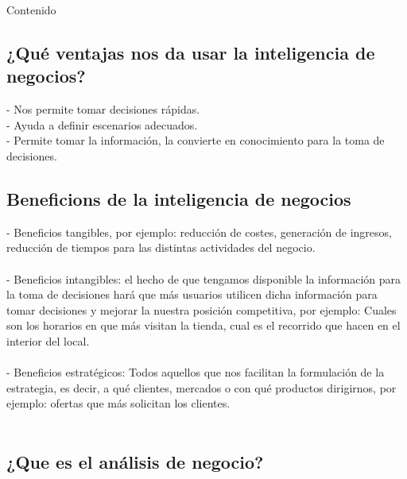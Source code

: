 \documentclass[twoside,twocolumn]{article}
\begin{document}
Contenido

\subsection{¿Qué ventajas nos da usar la inteligencia de negocios?}

- Nos permite tomar decisiones rápidas. \\
- Ayuda a definir escenarios adecuados. \\
- Permite tomar la información, la convierte en conocimiento para la toma de decisiones. \\
\subsection{Beneficions de la inteligencia de negocios}

- Beneficios tangibles, por ejemplo: reducción de costes, generación de ingresos, reducción de tiempos para las distintas actividades del negocio. \\\\
- Beneficios intangibles: el hecho de que tengamos disponible la información para la toma de decisiones hará que más usuarios utilicen dicha información para tomar decisiones y mejorar la nuestra posición competitiva, por ejemplo: Cuales son los horarios en que más visitan la tienda, cual es el recorrido que hacen en el interior del local. \\\\
- Beneficios estratégicos: Todos aquellos que nos facilitan la formulación de la estrategia, es decir, a qué clientes, mercados o con qué productos dirigirnos, por ejemplo: ofertas que más solicitan los clientes. \\\\

\subsection{¿Que es el análisis de negocio?}
\end{document}
